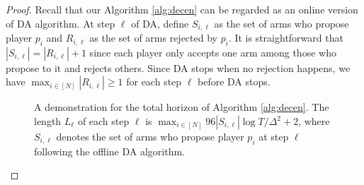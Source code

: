 \begin{proof}
Recall that our Algorithm \ref{alg:decen} can be regarded as an online version of DA algorithm. 
At step $\ell$ of DA, define $S_{i,\ell}$ as the set of arms who propose player $p_i$ and $R_{i,\ell}$ as the set of arms rejected by $p_i$. It is straightforward that $|S_{i,\ell}|=|R_{i,\ell}|+1$ since each player only accepts one arm among those who propose to it and rejects others. 
Since DA stops when no rejection happens, we have $\max_{i\in[N]}|R_{i,\ell}|\ge 1$ for each step $\ell$ before DA stops. 


\begin{figure}[tbh!]
\centering
\hspace{-0.6cm}

    \caption{A demonstration for the total horizon of Algorithm \ref{alg:decen}. The length $L_{\ell}$ of each step $\ell$ is $\max_{i\in[N]} 96{|S_{i,\ell}|\log T}/{\Delta^2}+2$, where $S_{i,\ell}$ denotes the set of arms who propose player $p_i$ at step $\ell$ following the offline DA algorithm.  
    }
    \label{fig:illustration}
\end{figure}



\end{proof}
